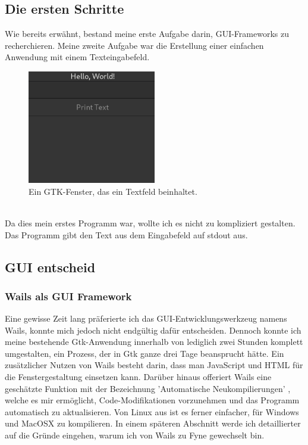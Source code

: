 \subsection{Die ersten Schritte}
Wie bereits erwähnt, bestand meine erste Aufgabe darin, GUI-Frameworks zu recherchieren. Meine zweite Aufgabe war die Erstellung einer einfachen Anwendung mit einem Texteingabefeld.
\begin{figure}[h]
\centering
\includegraphics[width=0.5\textwidth]{txt/pictures/simple_window.png}
\caption{Ein GTK-Fenster, das ein Textfeld beinhaltet.}
\label{fig:example}
\end{figure}
\\
Da dies mein erstes Programm war, wollte ich es nicht zu kompliziert gestalten. Das Programm gibt den Text aus dem Eingabefeld auf stdout aus.
\subsection{GUI entscheid}
\subsubsection{Wails als GUI Framework}
Eine gewisse Zeit lang präferierte ich das GUI-Entwicklungswerkzeug namens Wails, konnte mich jedoch nicht endgültig dafür entscheiden. Dennoch konnte ich meine bestehende Gtk-Anwendung innerhalb von lediglich zwei Stunden komplett umgestalten, ein Prozess, der in Gtk ganze drei Tage beansprucht hätte. Ein zusätzlicher Nutzen von Wails besteht darin, dass man JavaScript und HTML für die Fenstergestaltung einsetzen kann. Darüber hinaus offeriert Wails eine geschätzte Funktion mit der Bezeichnung 'Automatische Neukompilierungen' \cite{wailsAutoRebuild}, welche es mir ermöglicht, Code-Modifikationen vorzunehmen und das Programm automatisch zu aktualisieren. Von Linux aus ist es ferner einfacher, für Windows und MacOSX zu kompilieren. In einem späteren Abschnitt werde ich detaillierter auf die Gründe eingehen, warum ich von Wails zu Fyne gewechselt bin.
